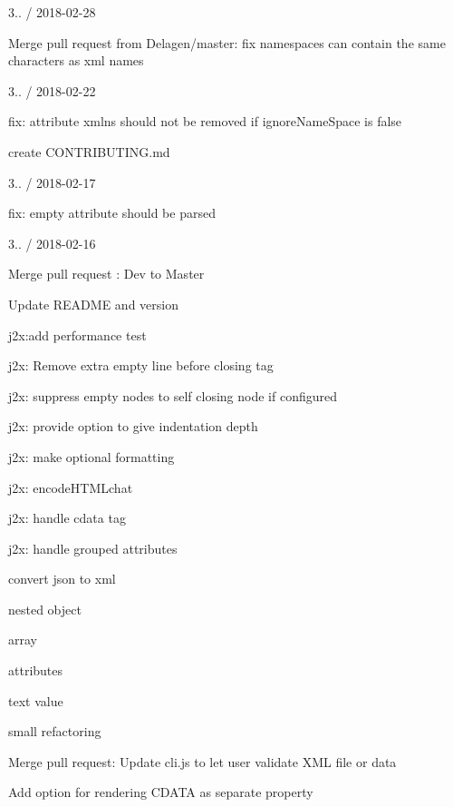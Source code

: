 3.. / 2018-\/02-\/28
\begin{DoxyItemize}
\item Merge pull request from Delagen/master\+: fix namespaces can contain the same characters as xml names
\end{DoxyItemize}

3.. / 2018-\/02-\/22
\begin{DoxyItemize}
\item fix\+: attribute xmlns should not be removed if ignore\+Name\+Space is false
\item create CONTRIBUTING.\+md
\end{DoxyItemize}

3.. / 2018-\/02-\/17
\begin{DoxyItemize}
\item fix\+: empty attribute should be parsed
\end{DoxyItemize}

3.. / 2018-\/02-\/16
\begin{DoxyItemize}
\item Merge pull request \+: Dev to Master
\item Update README and version
\item j2x\+:add performance test
\item j2x\+: Remove extra empty line before closing tag
\item j2x\+: suppress empty nodes to self closing node if configured
\item j2x\+: provide option to give indentation depth
\item j2x\+: make optional formatting
\item j2x\+: encode\+HTMLchat
\item j2x\+: handle cdata tag
\item j2x\+: handle grouped attributes
\item convert json to xml
\begin{DoxyItemize}
\item nested object
\item array
\item attributes
\item text value
\end{DoxyItemize}
\item small refactoring
\item Merge pull request\+: Update cli.\+js to let user validate XML file or data
\item Add option for rendering CDATA as separate property
\end{DoxyItemize}

